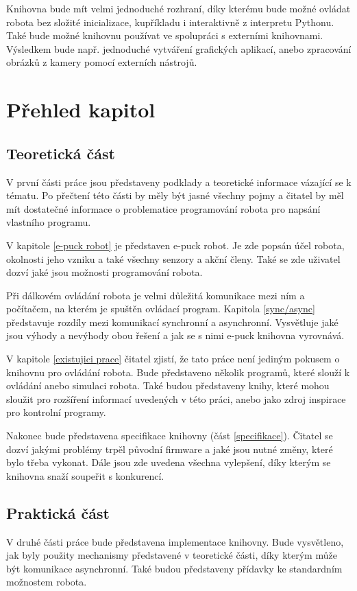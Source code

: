 \documentclass[12pt,notitlepage]{report}
\begin{document}
    Knihovna bude mít velmi jednoduché rozhraní, díky kterému bude možné
    ovládat robota bez složité inicializace, kupříkladu i interaktivně z
    interpretu Pythonu. Také bude možné knihovnu používat ve spolupráci s
    externími knihovnami. Výsledkem bude např. jednoduché vytváření grafických
    aplikací, anebo zpracování obrázků z kamery pomocí externích nástrojů.

    \section{Přehled kapitol}

    \subsection{Teoretická část}
    V první části práce jsou představeny podklady a teoretické informace
    vázající se k tématu. Po přečtení této části by měly být jasné všechny
    pojmy a čitatel by měl mít dostatečné informace o problematice programování
    robota pro napsání vlastního programu.

    V kapitole \ref{e-puck robot} je představen e-puck robot. Je zde popsán
    účel robota, okolnosti jeho vzniku a také všechny senzory a akční členy.
    Také se zde uživatel dozví jaké jsou možnosti programování robota.

    Při dálkovém ovládání robota je velmi důležitá komunikace mezi ním a
    počítačem, na kterém je spuštěn ovládací program. Kapitola \ref{sync/async}
    představuje rozdíly mezi komunikací synchronní a asynchronní. Vysvětluje
    jaké jsou výhody a nevýhody obou řešení a jak se s nimi e-puck knihovna
    vyrovnává.

    V kapitole \ref{existujici prace} čitatel zjistí, že tato práce není
    jediným pokusem o knihovnu pro ovládání robota. Bude představeno několik
    programů, které slouží k ovládání anebo simulaci robota. Také budou
    představeny knihy, které mohou sloužit pro rozšíření informací uvedených v
    této práci, anebo jako zdroj inspirace pro kontrolní programy.

    Nakonec bude představena specifikace knihovny (část \ref{specifikace}).
    Čitatel se dozví jakými problémy trpěl původní firmware a jaké jsou nutné
    změny, které bylo třeba vykonat. Dále jsou zde uvedena všechna vylepšení,
    díky kterým se knihovna snaží soupeřit s konkurencí.

    \subsection{Praktická část}
    V druhé části práce bude představena implementace knihovny. Bude
    vysvětleno, jak byly použity mechanismy představené v teoretické části,
    díky kterým může být komunikace asynchronní. Také budou představeny
    přídavky ke standardním možnostem robota.
\end{document}
